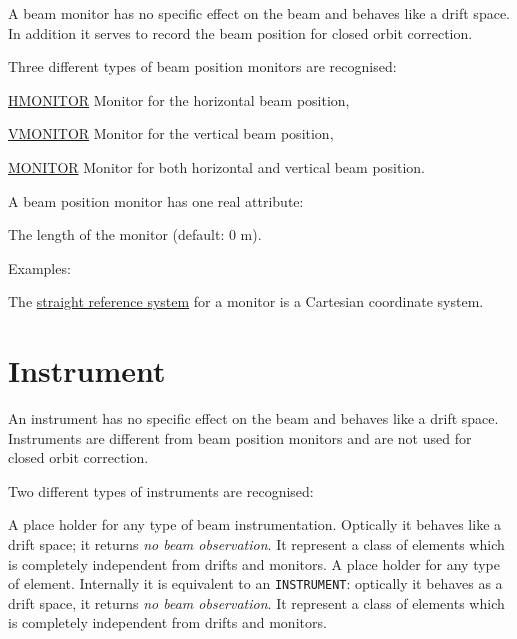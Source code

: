 {A beam monitor has no specific effect on the beam and behaves like a
drift space. 
In addition it serves to record the beam position for closed orbit
correction.

Three different types of beam position monitors are recognised:  

\begin{madlist}
   \item{\href{hmon}{HMONITOR}} Monitor for the horizontal beam position, 
   \item{\href{vmon}{VMONITOR}} Monitor for the vertical beam position, 
   \item{\href{mon}{MONITOR}} Monitor for both horizontal and vertical beam position. 
\end{madlist}


A beam position monitor has one real attribute: 
\begin{madlist}
    The length of the monitor (default: 0 m). 
\end{madlist}

Examples: 

The \hyperref[subsec:local_straight]{straight reference system} for a
monitor is a Cartesian coordinate system.  

\section{Instrument}
\label{sec:instrument}
An instrument has no specific effect on the beam and behaves like a
drift space. 
Instruments are different from beam position monitors and are not used
for closed orbit correction. 

Two different types of instruments are recognised:  

\begin{madlist}
    A place holder for any type of beam
     instrumentation. Optically it behaves like a drift space; it
     returns \emph{no beam observation}. It represent a class of
     elements which is completely independent from drifts and monitors.  
    A place holder for any type of
     element. Internally it is equivalent to an {\tt INSTRUMENT}: 
     optically it behaves as a drift space, it returns 
     \emph{no beam observation}. It represent a class of elements 
     which is completely independent from drifts and monitors. 
\end{madlist}

}
